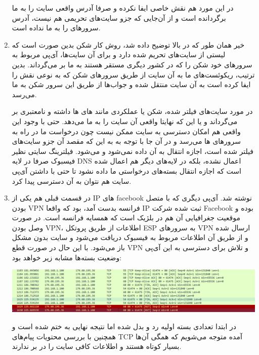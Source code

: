 \documentclass[12pt]{article}
\begin{document}
\begin{enumerate}
در این مورد  هم نقش خاصی ایفا نکرده و صرفا آدرس واقعی سایت  را به ما برگردانده است و از آن‌جایی که جزو سایت‌های تحریمی هم نیست، آدرس سرورهای  را به ما نداده است.


\item

خیر همان طور که در بالا توضیح داده شد، روش کار شکن بدین صورت است که لیستی از سایت‌های تحریم شده دارد و برای آن سایت‌ها، آی‌پی مربوط به سرورهای خود شکن را که در کشور دیگری مستقر هستند به ما بر می‌گرداند. بدین ترتیب، ریکوئست‌های ما به آن سایت از طریق سرورهای شکن که به نوعی نقش  را ایفا کرده است به آن سایت منتقل شده و جواب‌ها از طریق این سرور شکن به ما می‌رسد.

در مورد سایت‌های فیلتر شده، شکن یا عملکردی مانند  های  ها داشته و  نامعتبری بر می‌گرداند و یا این که نهایتا  واقعی آن سایت را به ما می‌دهد. حتی با وجود این  واقعی هم امکان دسترسی به سایت ممکن نیست چون درخواست ما در راه به سرورهای  ها می‌رسد و در آن جا با توجه به به این که مقصد آن جزو  سایت‌های فیلتر شده است، اجازه انتقال به آن داده نمی‌شود و  می‌شود. فیلترینگ سایتی نظیر فیسبوک صرفا در لایه DNS اعمال نشده، بلکه در لایه‌های دیگر هم اعمال شده است که اجازه انتقال بسته‌های درخواستی ما داده نشود تا حتی با داشتن آی‌پی سایت هم نتوان به آن دسترسی پیدا کرد.


\item

در قسمت قبلی هم یکی از IP های facebook نوشته شد. آی‌پی دیگری که با متصل بودن VPN فرانسه بدست آمد،  بود که واقعا IP ثبت شده شرکت Facebook بوده و موقعیت جغرافیایی آن هم در بلژیک است که همسایه فرانسه است.  در صورت وصل بودن VPN، اطلاعات از طریق پروتکل ESP به سرورهای VPN ارسال شده و از طریق آن اطلاعات مربوط به فیسبوک دریافت می‌شود و سایت بدون مشکل باز می‌شود. با این حال در صورت قطع VPN و تلاش برای دسترسی به این آی‌پی وضعیت بسته‌ها مشابه زیر خواهد بود:



	\begin{center}
	\includegraphics[width = 0.5 \textwidth]{images/8.png}
\end{center}

در ابتدا تعدادی بسته اولیه رد و بدل شده اما نتیجه نهایی به  ختم شده است و همچنین با بررسی محتویات پیام‌های TCP آمده متوجه می‌شویم که همگی آن‌ها بسیار کوتاه هستند و اطلاعات کافی سایت را در بر ندارند.



\end{enumerate}
\end{document}
